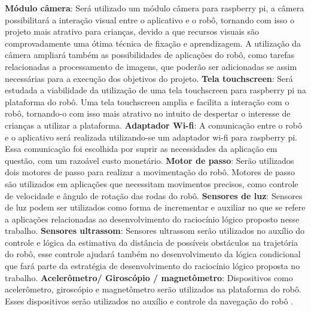 \textbf{Módulo câmera}: Será utilizado um módulo câmera para raspberry pi, a câmera possibilitará a interação visual entre o aplicativo e o robô, tornando com isso o projeto mais atrativo para crianças, devido a que recursos visuais são comprovadamente uma ótima técnica de fixação e aprendizagem. A utilização da câmera ampliará também as possibilidades de aplicações do robô, como tarefas relacionadas a processamento de imagens, que poderão ser adicionadas se assim necessárias para a execução dos objetivos do projeto.
\textbf{Tela touchscreen}: Será estudada a viabilidade da utilização de uma tela touchscreen para raspberry pi na plataforma do robô. Uma tela touchscreen amplia e facilita a interação com o robô, tornando-o com isso mais atrativo no intuito de despertar o interesse de crianças a utilizar a plataforma.
\textbf{Adaptador Wi-fi}: A comunicação entre o robô e o aplicativo será realizada utilizando-se um adaptador wi-fi para raspberry pi. Essa comunicação foi escolhida por suprir as necessidades da aplicação em questão, com um razoável custo monetário.
\textbf{Motor de passo}: Serão utilizados dois motores de passo para realizar a movimentação do robô. Motores de passo são utilizados em aplicações que necessitam movimentos precisos, como controle de velocidade e ângulo de rotação das rodas do robô.
\textbf{Sensores de luz}: Sensores de luz podem ser utilizados como forma de incrementar e auxiliar no que se refere a aplicações relacionadas ao desenvolvimento do raciocínio lógico proposto nesse trabalho.
\textbf{Sensores ultrassom}: Sensores ultrassom serão utilizados no auxílio do controle e lógica da estimativa da distância de possíveis obstáculos na trajetória do robô, esse controle ajudará também no desenvolvimento da lógica condicional que fará parte da estratégia de desenvolvimento do raciocínio lógico proposta no trabalho.
\textbf{Acelerômetro/ Giroscópio / magnetômetro}: Dispositivos como acelerômetro, giroscópio e magnetômetro serão utilizados na plataforma do robô. Esses dispositivos serão utilizados no auxílio e controle da navegação do robô \cite{brain:2015}.

